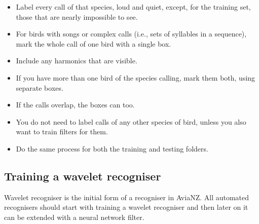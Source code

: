 \documentclass{article}
\begin{document}
\begin{description}
\begin{itemize}
\item Label every call of that species, loud and quiet, except, for the training set, those that are nearly impossible to see.
\item For birds with songs or complex calls (i.e., sets of syllables in a sequence), mark the whole call of one bird with a single box. 
\item Include any harmonics that are visible. 
\item If you have more than one bird of the species calling, mark them both, using separate boxes. 
\item If the calls overlap, the boxes can too. 
\item You do not need to label calls of any other species of bird, unless you also want to train filters for them. 
\item Do the same process for both the training and testing folders.
\end{itemize}
\end{description}

\subsection{Training a wavelet recogniser}
Wavelet recogniser is the initial form of a recogniser in AviaNZ. All automated recognisers should start with training a wavelet recogniser and then later on it can be extended with a neural network filter.
\end{document}

